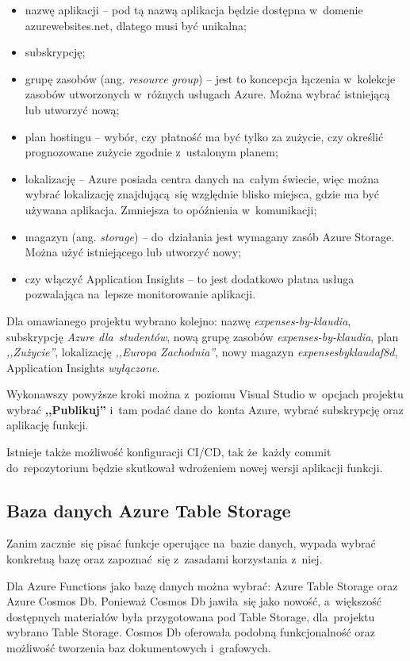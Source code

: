 \documentclass[12pt,a4paper,twoside,titlepage,openright]{book}
\begin{document}
\begin{itemize}
\item nazwę aplikacji -- pod tą nazwą aplikacja będzie dostępna w~domenie azurewebsites.net, dlatego musi być unikalna;
\item subskrypcję;
\item grupę zasobów (ang. \textit{resource group}) -- jest to koncepcja łączenia w~kolekcje zasobów utworzonych w~różnych usługach Azure. Można wybrać istniejącą lub utworzyć nową;
\item plan hostingu -- wybór, czy płatność ma być tylko za zużycie, czy określić prognozowane zużycie zgodnie z~ustalonym planem;
\item lokalizację -- Azure posiada centra danych na~całym świecie, więc można wybrać lokalizację znajdującą~się względnie blisko miejsca, gdzie ma być używana aplikacja. Zmniejsza to opóźnienia w~komunikacji;
\item magazyn (ang. \textit{storage}) -- do~działania jest wymagany zasób Azure Storage. Można użyć istniejącego lub utworzyć nowy;
\item czy włączyć Application Insights -- to jest dodatkowo płatna usługa pozwalająca na~lepsze monitorowanie aplikacji.
\end{itemize}

Dla omawianego projektu wybrano kolejno: nazwę \textit{expenses-by-klaudia}, subskrypcję   \textit{Azure dla~studentów}, nową grupę zasobów \textit{expenses-by-klaudia}, plan \textit{,,Zużycie''}, lokalizację \textit{,,Europa Zachodnia''}, nowy magazyn \textit{expensesbyklaudaf8d}, Application Insights \textit{wyłączone}.

Wykonawszy powyższe kroki można z~poziomu Visual Studio w~opcjach projektu wybrać \textbf{,,Publikuj''} i~tam podać dane do~konta Azure, wybrać subskrypcję oraz aplikację funkcji. 

Istnieje także możliwość konfiguracji CI/CD, tak że~każdy commit do~repozytorium będzie skutkował wdrożeniem nowej wersji aplikacji funkcji.

\subsection{Baza danych Azure Table Storage}

Zanim zacznie~się pisać funkcje operujące na~bazie danych, wypada wybrać konkretną bazę oraz zapoznać~się z~zasadami korzystania z~niej. 

Dla Azure Functions jako bazę danych można wybrać: Azure Table Storage oraz Azure Cosmos Db. Ponieważ Cosmos Db jawiła~się jako nowość, a~większość dostępnych materiałów była przygotowana pod Table Storage, dla~projektu wybrano Table Storage. Cosmos Db oferowała podobną funkcjonalność oraz możliwość tworzenia baz dokumentowych i~grafowych.
\end{document}
